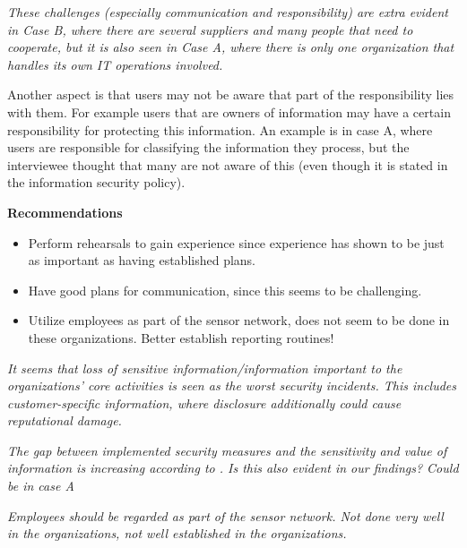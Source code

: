 \textit{These challenges (especially communication and responsibility) are extra evident in Case B, where there are several suppliers and many people that need to cooperate, but it is also seen in Case A, where there is only one organization that handles its own IT operations involved.}

Another aspect is that users may not be aware that part of the responsibility lies with them. For example users that are owners of information may have a certain responsibility for protecting this information. An example is in case A, where users are responsible for classifying the information they process, but the interviewee thought that many are not aware of this (even though it is stated in the information security policy).

\textbf{Recommendations}
\begin{itemize}
\item Perform rehearsals to gain experience since experience has shown to be just as important as having established plans.
\item Have good plans for communication, since this seems to be challenging.
\item Utilize employees as part of the sensor network, does not seem to be done in these organizations. Better establish reporting routines!
\end{itemize}

\textit{It seems that loss of sensitive information/information important to the organizations' core activities is seen as the worst security incidents. This includes customer-specific information, where disclosure additionally could cause reputational damage.}

\textit{The gap between implemented security measures and the sensitivity and value of information is increasing according to \cite{Morketall2012}. Is this also evident in our findings? Could be in case A}

\textit{Employees should be regarded as part of the sensor network. Not done very well in the organizations, not well established in the organizations.}